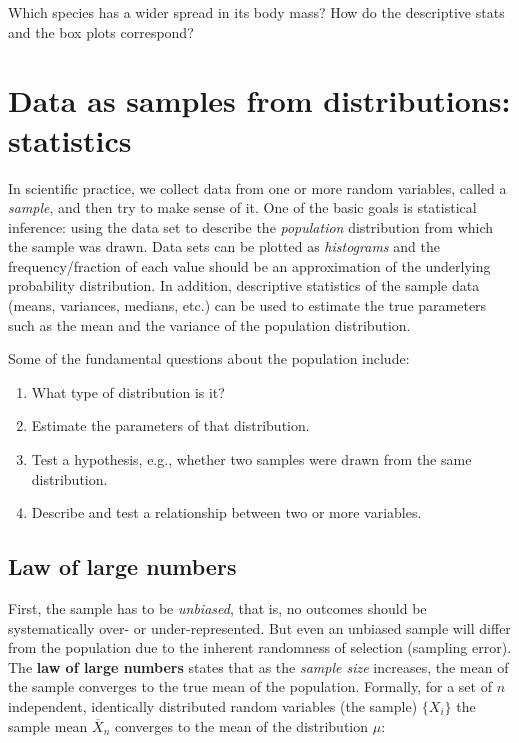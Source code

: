 \documentclass[
  letterpaper,
  DIV=11,
  numbers=noendperiod]{scrreprt}
\begin{document}
Which species has a wider spread in its body mass? How do the
descriptive stats and the box plots correspond?

\section{Data as samples from distributions:
statistics}\label{data-as-samples-from-distributions-statistics}

In scientific practice, we collect data from one or more random
variables, called a \emph{sample}, and then try to make sense of it. One
of the basic goals is statistical inference: using the data set to
describe the \emph{population} distribution from which the sample was
drawn. Data sets can be plotted as \emph{histograms} and the
frequency/fraction of each value should be an approximation of the
underlying probability distribution. In addition, descriptive statistics
of the sample data (means, variances, medians, etc.) can be used to
estimate the true parameters such as the mean and the variance of the
population distribution.

Some of the fundamental questions about the population include:

\begin{enumerate}
\def\labelenumi{\arabic{enumi}.}
\item
  What type of distribution is it?
\item
  Estimate the parameters of that distribution.
\item
  Test a hypothesis, e.g., whether two samples were drawn from the same
  distribution.
\item
  Describe and test a relationship between two or more variables.
\end{enumerate}

\subsection{Law of large numbers}\label{law-of-large-numbers}

First, the sample has to be \emph{unbiased}, that is, no outcomes should
be systematically over- or under-represented. But even an unbiased
sample will differ from the population due to the inherent randomness of
selection (sampling error). The \textbf{law of large numbers} states
that as the \emph{sample size} increases, the mean of the sample
converges to the true mean of the population. Formally, for a set of
\(n\) independent, identically distributed random variables (the sample)
\(\{X_i\}\) the sample mean \(\overline{X}_n\) converges to the mean of
the distribution \(\mu\):
\end{document}
